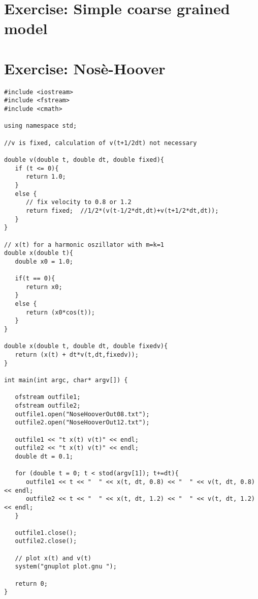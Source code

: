 \documentclass[11pt]{article}
\begin{document}
\date{\today}

\section{Exercise: Simple coarse grained model}

\section{Exercise: Nos\`{e}-Hoover}
\begin{lstlisting}
#include <iostream>
#include <fstream>
#include <cmath>

using namespace std;

//v is fixed, calculation of v(t+1/2dt) not necessary

double v(double t, double dt, double fixed){
   if (t <= 0){
      return 1.0;
   }
   else {
      // fix velocity to 0.8 or 1.2
      return fixed;  //1/2*(v(t-1/2*dt,dt)+v(t+1/2*dt,dt));
   }
}

// x(t) for a harmonic oszillator with m=k=1
double x(double t){
   double x0 = 1.0;

   if(t == 0){
      return x0;
   }
   else {
      return (x0*cos(t));
   }
}

double x(double t, double dt, double fixedv){
   return (x(t) + dt*v(t,dt,fixedv));
}

int main(int argc, char* argv[]) {

   ofstream outfile1;
   ofstream outfile2;
   outfile1.open("NoseHooverOut08.txt");
   outfile2.open("NoseHooverOut12.txt");

   outfile1 << "t x(t) v(t)" << endl;
   outfile2 << "t x(t) v(t)" << endl;
   double dt = 0.1;

   for (double t = 0; t < stod(argv[1]); t+=dt){
      outfile1 << t << "  " << x(t, dt, 0.8) << "  " << v(t, dt, 0.8) << endl;
      outfile2 << t << "  " << x(t, dt, 1.2) << "  " << v(t, dt, 1.2) << endl;
   }

   outfile1.close();
   outfile2.close();
   
   // plot x(t) and v(t)
   system("gnuplot plot.gnu ");

   return 0;
}

\end{lstlisting}
\newpage
\end{document}
